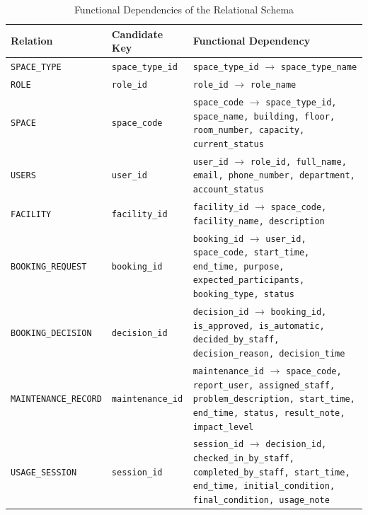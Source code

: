 \begin{table}[H]
\centering
\scriptsize
\caption{Functional Dependencies of the Relational Schema}
\label{tab:functional-dependencies}
\begin{tabularx}{\textwidth}{|>{\raggedright\arraybackslash}p{3.4cm}|>{\raggedright\arraybackslash}p{3.7cm}|>{\raggedright\arraybackslash}X|}
\hline
\textbf{Relation} & \textbf{Candidate Key} & \textbf{Functional Dependency} \\ \hline

\texttt{SPACE\_TYPE}
&
\texttt{space\_type\_id}
&
\texttt{space\_type\_id} $\rightarrow$ \texttt{space\_type\_name}
\\ \hline

\texttt{ROLE}
&
\texttt{role\_id}
&
\texttt{role\_id} $\rightarrow$ \texttt{role\_name}
\\ \hline

\texttt{SPACE}
&
\texttt{space\_code}
&
\texttt{space\_code} $\rightarrow$
\texttt{space\_type\_id, space\_name, building, floor,
room\_number, capacity, current\_status}
\\ \hline

\texttt{USERS}
&
\texttt{user\_id}
&
\texttt{user\_id} $\rightarrow$
\texttt{role\_id, full\_name, email, phone\_number,
department, account\_status}
\\ \hline

\texttt{FACILITY}
&
\texttt{facility\_id}
&
\texttt{facility\_id} $\rightarrow$
\texttt{space\_code, facility\_name, description}
\\ \hline

\texttt{BOOKING\_REQUEST}
&
\texttt{booking\_id}
&
\texttt{booking\_id} $\rightarrow$
\texttt{user\_id, space\_code, start\_time, end\_time,
purpose, expected\_participants, booking\_type, status}
\\ \hline

\texttt{BOOKING\_DECISION}
&
\texttt{decision\_id}
&
\texttt{decision\_id} $\rightarrow$
\texttt{booking\_id, is\_approved, is\_automatic,
decided\_by\_staff, decision\_reason, decision\_time}
\\ \hline

\texttt{MAINTENANCE\_RECORD}
&
\texttt{maintenance\_id}
&
\texttt{maintenance\_id} $\rightarrow$
\texttt{space\_code, report\_user, assigned\_staff,
problem\_description, start\_time, end\_time, status,
result\_note, impact\_level}
\\ \hline

\texttt{USAGE\_SESSION}
&
\texttt{session\_id}
&
\texttt{session\_id} $\rightarrow$
\texttt{decision\_id, checked\_in\_by\_staff,
completed\_by\_staff, start\_time, end\_time,
initial\_condition, final\_condition, usage\_note}
\\ \hline


\end{tabularx}
\end{table}
